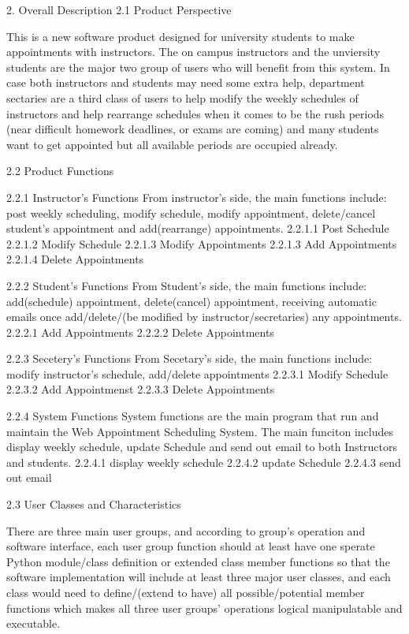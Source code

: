  
2.	Overall Description
2.1 Product Perspective

This is a new software product designed for university students to make appointments with instructors. The on campus instructors and the unviersity students are the major two group of users who will benefit from this system. In case both instructors and students may need some extra help, department sectaries are a third class of users to help modify the weekly schedules of instructors and help rearrange schedules when it comes to be the rush periods (near difficult homework deadlines, or exams are coming) and many students want to get appointed but all available periods are occupied already. 

2.2 Product Functions

2.2.1 Instructor's Functions
From instructor's side, the main functions include: post weekly scheduling, modify schedule, modify appointment, delete/cancel student's appointment and add(rearrange) appointments. 
2.2.1.1 Post Schedule
2.2.1.2 Modify Schedule
2.2.1.3 Modify Appointments
2.2.1.3 Add Appointments
2.2.1.4 Delete Appointments
     
2.2.2 Student's Functions
From Student's side, the main functions include: add(schedule) appointment, delete(cancel) appointment, receiving automatic emails once add/delete/(be modified by instructor/secretaries) any appointments.
2.2.2.1 Add Appointments
2.2.2.2 Delete Appointments
     
2.2.3 Secetery's Functions
From Secetary's side, the main functions include: modify instructor's schedule, add/delete appointments
2.2.3.1 Modify Schedule
2.2.3.2 Add Appointmenst
2.2.3.3 Delete Appointments

2.2.4 System Functions
System functions are the main program that run and maintain the Web Appointment Scheduling System. The main funciton includes display weekly schedule, update Schedule and send out email to both Instructors and students. 
2.2.4.1 display weekly schedule
2.2.4.2 update Schedule
2.2.4.3 send out email

2.3 User Classes and Characteristics

There are three main user groups, and according to group's operation and software interface, each user group function should at least have one sperate Python module/class definition or extended class member functions so that the software implementation will include at least three major user classes, and each class would need to define/(extend to have) all possible/potential member functions which makes all three user groups' operations logical manipulatable and executable. 

